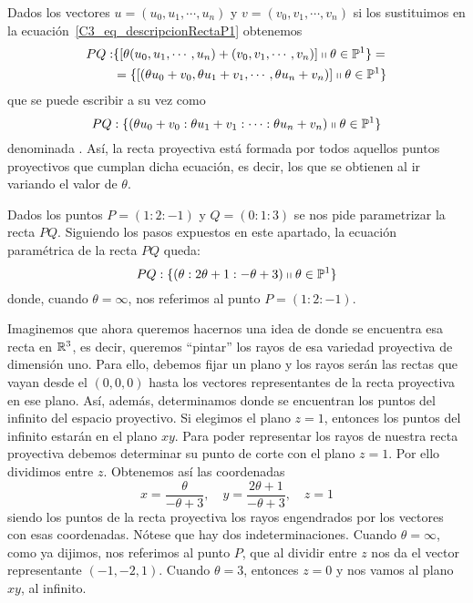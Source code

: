 Dados los vectores $u=(u_0,u_1,\cdots,u_n)$ y $v=(v_0,v_1,\cdots,v_n)$ si los sustituimos en la ecuación~\eqref{C3_eq_descripcionRectaP1} obtenemos
\begin{equation*}
	\label{C_3_eq_parametrica_recta}
	\begin{split}
		PQ:&\{\left [ \theta (u_0,u_1,\cdots,u_n)+(v_0,v_1,\cdots,v_n) \right ]\shortparallel \theta\in\mathbb{P}^1\}=\\
		&=\{\left [ (\theta u_0+v_0,\theta u_1+v_1,\cdots,\theta u_n+v_n) \right ]\shortparallel \theta\in\mathbb{P}^1\}
	\end{split}
\end{equation*}
que se puede escribir a su vez como 
\begin{equation}
	PQ:\{(\theta u_0+v_0:\theta u_1+v_1:\cdots:\theta u_n+v_n)\shortparallel \theta\in\mathbb{P}^1\}
\end{equation}
denominada . Así, la recta proyectiva está formada por todos aquellos puntos proyectivos que cumplan dicha ecuación, es decir, los que se obtienen al ir variando el valor de $\theta$.
\begin{exa}
	\label{C3_exa_rectaConcreta}
	Dados los puntos $P=(1:2:-1)$ y $Q=(0:1:3)$ se nos pide parametrizar la recta $PQ$. Siguiendo los pasos expuestos en este apartado, la ecuación paramétrica de la recta $PQ$ queda:
	\[
	PQ:\{(\theta:2\theta+1:-\theta+3)\shortparallel\theta\in\mathbb{P}^1\}
	\]
	donde, cuando $\theta=\infty$, nos referimos al punto $P=(1:2:-1)$.
	
	Imaginemos que ahora queremos hacernos una idea de donde se encuentra esa recta en $\mathbb{R}^3$, es decir, queremos ``pintar'' los rayos de esa variedad proyectiva de dimensión uno. Para ello, debemos fijar un plano y los rayos serán las rectas que vayan desde el $(0,0,0)$ hasta los vectores representantes de la recta proyectiva en ese plano. Así, además, determinamos donde se encuentran los puntos del infinito del espacio proyectivo. Si elegimos el plano $z=1$, entonces los puntos del infinito estarán en el plano $xy$. Para poder representar los rayos de nuestra recta proyectiva debemos determinar su punto de corte con el plano $z=1$. Por ello dividimos entre $z$. Obtenemos así las coordenadas
	\begin{equation*}
		x=\frac{\theta}{-\theta+3}, \quad y=\frac{2\theta+1}{-\theta+3}, \quad z=1
	\end{equation*}
	siendo los puntos de la recta proyectiva los rayos engendrados por los vectores con esas coordenadas. Nótese que hay dos indeterminaciones. Cuando $\theta=\infty$, como ya dijimos, nos referimos al punto $P$, que al dividir entre $z$ nos da el vector representante $(-1,-2,1)$. Cuando $\theta=3$, entonces $z=0$ y nos vamos al plano $xy$, al infinito.
\end{exa}

